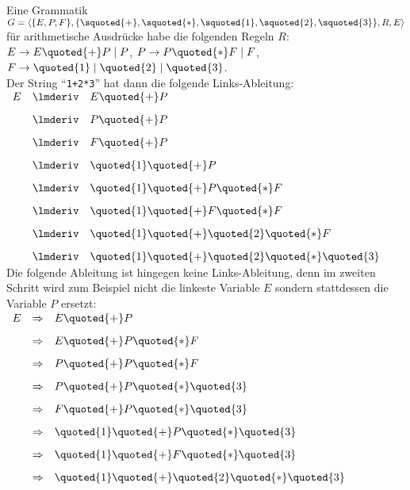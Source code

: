 \example
Eine Grammatik 
$G = \langle \{ E, P, F\}, \{ \squoted{+}, \squoted{*}, \squoted{1}, \squoted{2}, \squoted{3} \}, R, E \rangle$ 
f\"ur arithmetische Ausdr\"ucke habe die folgenden Regeln $R$:
\\[0.2cm]
\hspace*{1.3cm}
$E \rightarrow E \quoted{+} P \;|\; P$, \quad
$P \rightarrow P \quoted{*} F \;|\; F$, \quad
$F \rightarrow \quoted{1} \;|\; \quoted{2} \;|\; \quoted{3}$.
\\[0.2cm]
Der String ``\texttt{1+2*3}'' hat dann die folgende Links-Ableitung:
\\[0.2cm]
\hspace*{1.3cm}
$
\begin{array}[t]{lcl}
  E & \lmderiv & E \quoted{+} P \\[0.3cm]
    & \lmderiv & P \quoted{+} P \\[0.3cm]
    & \lmderiv & F \quoted{+} P \\[0.3cm]
    & \lmderiv & \quoted{1} \quoted{+} P \\[0.3cm]
    & \lmderiv & \quoted{1} \quoted{+} P \quoted{*} F \\[0.3cm]
    & \lmderiv & \quoted{1} \quoted{+} F \quoted{*} F \\[0.3cm]
    & \lmderiv & \quoted{1} \quoted{+} \quoted{2} \quoted{*} F \\[0.3cm]
    & \lmderiv & \quoted{1} \quoted{+} \quoted{2} \quoted{*} \quoted{3} 
\end{array}
$
\\[0.2cm]
Die folgende Ableitung ist hingegen keine Links-Ableitung, denn im zweiten Schritt wird
zum Beispiel nicht die linkeste Variable $E$ sondern stattdessen die Variable $P$ ersetzt:
\\[0.2cm]
\hspace*{1.3cm}
$
\begin{array}[t]{lcl}
  E & \Rightarrow & E \quoted{+} P \\[0.3cm]
    & \Rightarrow & E \quoted{+} P \quoted{*} F \\[0.3cm]
    & \Rightarrow & P \quoted{+} P \quoted{*} F \\[0.3cm]
    & \Rightarrow & P \quoted{+} P \quoted{*} \quoted{3} \\[0.3cm]
    & \Rightarrow & F \quoted{+} P \quoted{*} \quoted{3} \\[0.3cm]
    & \Rightarrow & \quoted{1} \quoted{+} P \quoted{*} \quoted{3} \\[0.3cm]
    & \Rightarrow & \quoted{1} \quoted{+} F \quoted{*} \quoted{3} \\[0.3cm]
    & \Rightarrow & \quoted{1} \quoted{+} \quoted{2} \quoted{*} \quoted{3}  \\[0.3cm]
\end{array}
$

